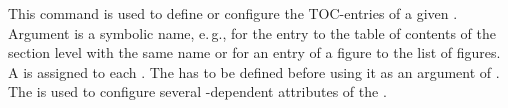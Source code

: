 \begin{Declaration}
\end{Declaration}
This command is used to define
or configure the TOC-entries of a given . Argument
 is a symbolic name, e.\,g.,  for the entry
to the table of contents of the section level with the same name or
 for an entry of a figure to the list of figures. A 
is assigned to each . The  has to be defined
before using it as an argument of . The
 is used to configure several -dependent
attributes of the .

